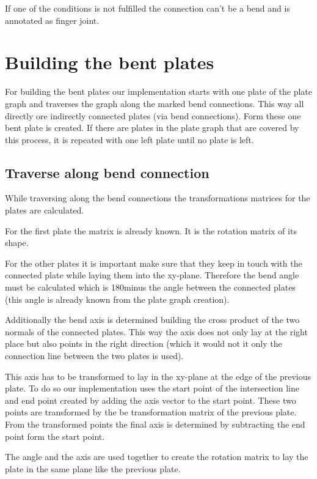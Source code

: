 \documentclass[../ClassicThesis.tex]{subfiles}
\begin{document}
If one of the conditions is not fulfilled the connection can't be a bend and is annotated as finger joint.

\section{Building the bent plates}
For building the bent plates our implementation starts with one plate of the plate graph and traverses the graph along the marked bend connections. This way all directly ore indirectly connected plates (via bend connections). Form these one bent plate is created. If there are plates in the plate graph that are covered by this process, it is repeated with one left plate until no plate is left.

\subsection{Traverse along bend connection}

While traversing along the bend connections the transformations matrices for the plates are calculated.

For the first plate the matrix is already known. It is the rotation matrix of its shape.

For the other plates it is important make sure that they keep in touch with the connected plate while laying them into the xy-plane. Therefore the bend angle must be calculated which is 180\textdegree  minus the angle between the connected plates (this angle is already known from the plate graph creation).

Additionally the bend axis is determined building the cross product of the two normals of the connected plates. This way the axis does not only lay at the right place but also points in the right direction (which it would not it only the connection line between the two plates is used).

This axis has to be transformed to lay in the xy-plane at the edge of the previous plate. To do so our implementation uses the start point of the intersection line and end point created by adding the axis vector to the start point. These two points are transformed by the be transformation matrix of the previous plate. From the transformed points the final axis is determined by subtracting the end point form the start point.

The angle and the axis are used together to create the rotation matrix to lay the plate in the same plane like the previous plate.
\end{document}
